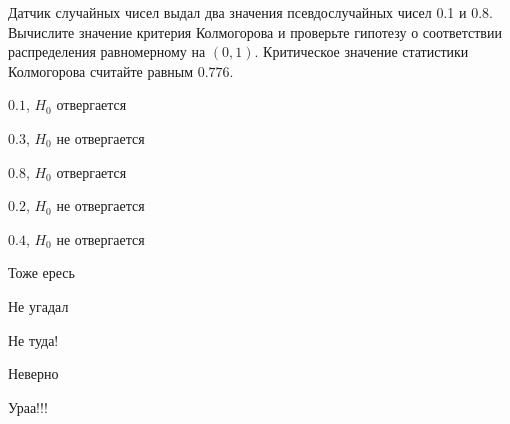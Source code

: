 
\begin{question}
Датчик случайных чисел выдал два значения псевдослучайных чисел 0.1 и
0.8. Вычислите значение критерия Колмогорова и проверьте гипотезу о
соответствии распределения равномерному на \((0,1)\). Критическое
значение статистики Колмогорова считайте равным \(0.776\).
\begin{answerlist}
  \item \(0.1\), \(H_0\) отвергается
  \item \(0.3\), \(H_0\) не отвергается
  \item \(0.8\), \(H_0\) отвергается
  \item \(0.2\), \(H_0\) не отвергается
  \item \(0.4\), \(H_0\) не отвергается
\end{answerlist}
\end{question}

\begin{solution}
\begin{answerlist}
  \item Тоже ересь
  \item Не угадал
  \item Не туда!
  \item Неверно
  \item Ураа!!!
\end{answerlist}
\end{solution}

